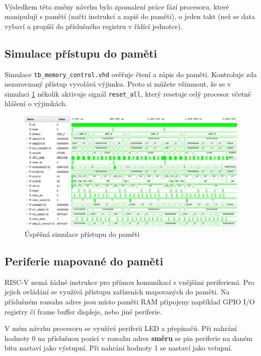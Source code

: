 \documentclass[FM,BP]{tulthesis}
\begin{document}
\paragraph{}
Výsledkem této změny návrhu bylo zpomalení práce fází procesoru, které manipulují s pamětí (načti instrukci a zapiš do paměti), o jeden takt (než se data vybaví a propíší do příslušného registru v řídící jednotce). 

\subsection{Simulace přístupu do paměti}
Simulace \verb|tb_memory_control.vhd| ověřuje čtení a zápis do paměti. Kontroluje zda nezarovnaný přístup vyvolává výjimku. Proto si můžete všimnout, že se v simulaci \ref{img:MEM_simulace} několik aktivuje signál \verb|reset_all|, který resetuje celý procesor včetně hlášení o výjimkách. 

\begin{figure}[h]
    \centering
    \includegraphics[width=\textwidth]{assets/MEM_simulation.png}
    \caption{Úspěšná simulace přístupu do paměti}
    \label{img:MEM_simulace}
\end{figure}

\newpage
\subsection{Periferie mapované do paměti}
RISC-V nemá žádné instrukce pro přímou komunikací s vnějšími periferiemi. Pro jejich ovládání se využívá přístupu zařízeních mapovaných do paměti. Na příslušném rozsahu adres jsou místo paměti RAM připojeny například GPIO I/O registry či frame buffer displeje, nebo jiné periferie. 

V mém návrhu procesoru se využívá periferií LED a přepínačů. Při nahrání hodnoty 0 na příslušnou pozici v rozsahu adres \textbf{směru} se pin periferie na daném bitu nastaví jako výstupní. Při nahrání hodnoty 1 se nastaví jako vstupní. 
\end{document}
